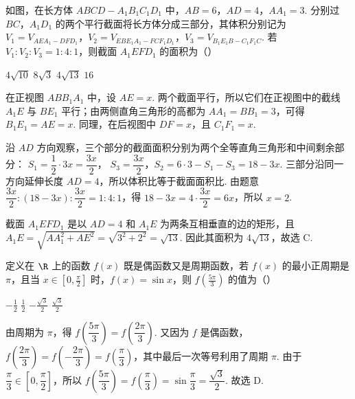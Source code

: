 \begin{problem}
如图，在长方体 \(ABCD - A_{1}B_{1}C_{1}D_{1}\) 中，\(AB = 6\)，\(AD = 4\)，\(AA_{1} = 3\). 分别过 \(BC\)，\(A_{1}D_{1}\) 的两个平行截面将长方体分成三部分，其体积分别记为 \(V_{1} = V_{AEA_{1}-DFD_{1}}\)，\(V_{2} = V_{EBE_{1}A_{1}-FCF_{1}D_{1}}\)，\(V_{3} = V_{B_{1}E_{1}B-C_{1}F_{1}C}\). 若 \(V_{1}:V_{2}:V_{3} = 1:4:1\)，则截面 \(A_{1}EFD_{1}\) 的面积为（\quad）


\choices
    {\(4\sqrt{10}\)}
    {\(8\sqrt{3}\)}
    {\(4\sqrt{13}\)}
    {\(16\)}
\begin{solution}
在正视图 \(ABB_1A_1\) 中，设 \(AE=x\). 两个截面平行，所以它们在正视图中的截线 \(A_1E\) 与 \(BE_1\) 平行；由两侧直角三角形的高都为 \(AA_1=BB_1=3\)，可得 \(B_1E_1=AE=x\). 同理，在后视图中 \(DF=x\)，且 \(C_1F_1=x\).

沿 \(AD\) 方向观察，三个部分的截面面积分别为两个全等直角三角形和中间剩余部分：
\(S_1=\dfrac12\cdot3x=\dfrac{3x}{2}\)，
\(S_3=\dfrac{3x}{2}\)，\(S_2=6\cdot3-S_1-S_3=18-3x\). 三部分沿同一方向延伸长度 \(AD=4\)，所以体积比等于截面面积比. 由题意
\(\dfrac{3x}{2}:\left(18-3x\right):\dfrac{3x}{2}=1:4:1\)，得
\(18-3x=4\cdot\dfrac{3x}{2}=6x\)，所以 \(x=2\).

截面 \(A_1EFD_1\) 是以 \(AD=4\) 和 \(A_1E\) 为两条互相垂直的边的矩形，且
\(A_1E=\sqrt{AA_1^2+AE^2}=\sqrt{3^2+2^2}=\sqrt{13}\). 因此其面积为 \(4\sqrt{13}\)，故选 C.
\end{solution}
\end{problem}

\begin{problem}
定义在 \(\R\) 上的函数 \(f(x)\) 既是偶函数又是周期函数，若 \(f(x)\) 的最小正周期是 \(\pi\)，且当 \(x \in \left[0, \frac{\pi}{2}\right]\) 时，\(f(x) = \sin x\)，则 \(f\left(\frac{5\pi}{3}\right)\) 的值为（\quad）

\choices
    {\(-\frac{1}{2}\)}
    {\(\frac{1}{2}\)}
    {\(-\frac{\sqrt{3}}{2}\)}
    {\(\frac{\sqrt{3}}{2}\)}
\begin{solution}
由周期为 \(\pi\)，得
\(f\left(\dfrac{5\pi}{3}\right)=f\left(\dfrac{2\pi}{3}\right)\). 又因为 \(f\) 是偶函数，
\(f\left(\dfrac{2\pi}{3}\right)=f\left(-\dfrac{2\pi}{3}\right)=f\left(\dfrac\pi3\right)\)，其中最后一次等号利用了周期 \(\pi\). 由于 \(\dfrac\pi3\in\left[0,\dfrac\pi2\right]\)，所以
\(f\left(\dfrac{5\pi}{3}\right)=f\left(\dfrac\pi3\right)=\sin\dfrac\pi3=\dfrac{\sqrt3}{2}\). 故选 D.
\end{solution}
\end{problem}

